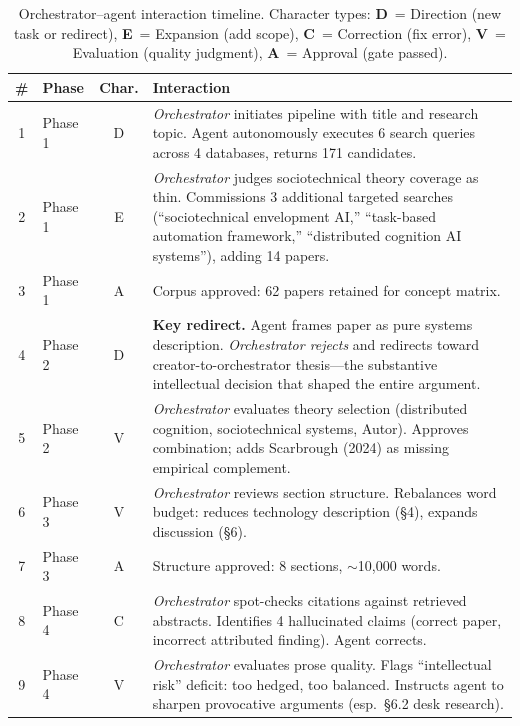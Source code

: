 \begin{table}[H]
\centering
\small
\caption{Orchestrator--agent interaction timeline. Character types: \textbf{D}~= Direction (new task or redirect), \textbf{E}~= Expansion (add scope), \textbf{C}~= Correction (fix error), \textbf{V}~= Evaluation (quality judgment), \textbf{A}~= Approval (gate passed).}
\label{tab:timeline}
\begin{tabularx}{\textwidth}{@{} c l c X @{}}
\toprule
\textbf{\#} & \textbf{Phase} & \textbf{Char.} & \textbf{Interaction} \\
\midrule
1 & Phase 1 & D & \textit{Orchestrator} initiates pipeline with title and research topic. Agent autonomously executes 6 search queries across 4 databases, returns 171 candidates. \\[0.3em]
2 & Phase 1 & E & \textit{Orchestrator} judges sociotechnical theory coverage as thin. Commissions 3 additional targeted searches (``sociotechnical envelopment AI,'' ``task-based automation framework,'' ``distributed cognition AI systems''), adding 14 papers. \\[0.3em]
3 & Phase 1 & A & Corpus approved: 62 papers retained for concept matrix. \\[0.3em]
4 & Phase 2 & D & \textbf{Key redirect.} Agent frames paper as pure systems description. \textit{Orchestrator rejects} and redirects toward creator-to-orchestrator thesis---the substantive intellectual decision that shaped the entire argument. \\[0.3em]
5 & Phase 2 & V & \textit{Orchestrator} evaluates theory selection (distributed cognition, sociotechnical systems, Autor). Approves combination; adds Scarbrough (2024) as missing empirical complement. \\[0.3em]
6 & Phase 3 & V & \textit{Orchestrator} reviews section structure. Rebalances word budget: reduces technology description (\S4), expands discussion (\S6). \\[0.3em]
7 & Phase 3 & A & Structure approved: 8 sections, $\sim$10{,}000 words. \\[0.3em]
8 & Phase 4 & C & \textit{Orchestrator} spot-checks citations against retrieved abstracts. Identifies 4 hallucinated claims (correct paper, incorrect attributed finding). Agent corrects. \\[0.3em]
9 & Phase 4 & V & \textit{Orchestrator} evaluates prose quality. Flags ``intellectual risk'' deficit: too hedged, too balanced. Instructs agent to sharpen provocative arguments (esp.\ \S6.2 desk research). \\[0.3em]

\end{tabularx}
\end{table}
